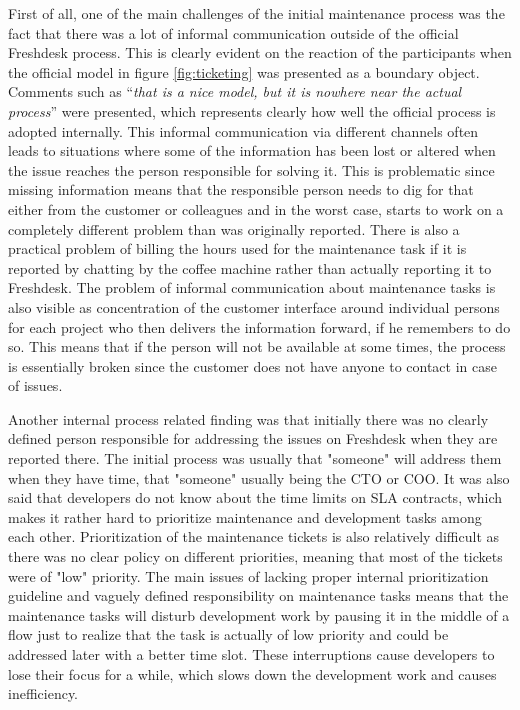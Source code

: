 First of all, one of the main challenges of the initial maintenance process was the fact that there was a lot of informal communication outside of the official Freshdesk process.
This is clearly evident on the reaction of the participants when the official model in figure \ref{fig:ticketing} was presented as a boundary object. Comments such as
``\emph{that is a nice model, but it is nowhere near the actual process}'' were presented, which represents clearly how well the official process is adopted internally. This informal
communication via different channels often leads to situations where some of the information has been lost or altered when the issue reaches the person responsible for solving it.
This is problematic since missing information means that the responsible person needs to dig for that either from the customer or colleagues and in the worst case, starts to work
on a completely different problem than was originally reported. There is also a practical problem of billing the hours used for the maintenance task if it is reported by chatting by
the coffee machine rather than actually reporting it to Freshdesk. The problem of informal communication about maintenance tasks is also visible as concentration of the customer interface
around individual persons for each project who then delivers the information forward, if he remembers to do so. This means that if the person will not be available at some times,
the process is essentially broken since the customer does not have anyone to contact in case of issues.

Another internal process related finding was that initially there was no clearly defined person responsible for addressing the issues on Freshdesk when they are reported there.
The initial process was usually that "someone" will address them when they have time, that "someone" usually being the CTO or COO. It was also said that developers do not know
about the time limits on SLA contracts, which makes it rather hard to prioritize maintenance and development tasks among each other. Prioritization of the maintenance tickets
is also relatively difficult as there was no clear policy on different priorities, meaning that most of the tickets were of "low" priority. The main issues of lacking proper internal
prioritization guideline and vaguely defined responsibility on maintenance tasks means that the maintenance tasks will disturb development work by pausing it in the middle of
a flow just to realize that the task is actually of low priority and could be addressed later with a better time slot. These interruptions cause developers to lose their focus
for a while, which slows down the development work and causes inefficiency.

